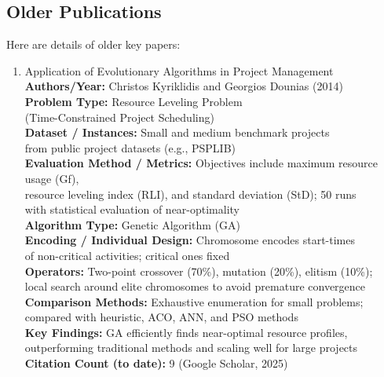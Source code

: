 \documentclass[a4paper,12pt]{article}
\begin{document}
\subsection{Older Publications}
Here are details of older key papers:
\begin{enumerate}[leftmargin=2em, labelwidth=1em, labelsep=0.5em, itemsep=1ex]
  \item Application of Evolutionary Algorithms in Project Management \\
    \textbf{Authors/Year:} Christos Kyriklidis and Georgios Dounias (2014) \\  
    \textbf{Problem Type:} Resource Leveling Problem\\
    (Time-Constrained Project Scheduling) \\  
    \textbf{Dataset / Instances:} Small and medium benchmark projects\\
    from public project datasets (e.g., PSPLIB) \\  
    \textbf{Evaluation Method / Metrics:} Objectives include maximum resource usage (Gf),\\
    resource leveling index (RLI), and standard deviation (StD); 50 runs\\
    with statistical evaluation of near-optimality \\  
    \textbf{Algorithm Type:} Genetic Algorithm (GA) \\  
    \textbf{Encoding / Individual Design:} Chromosome encodes start-times\\
    of non-critical activities; critical ones fixed \\  
    \textbf{Operators:} Two-point crossover (70\%), mutation (20\%), elitism (10\%);\\
    local search around elite chromosomes to avoid premature convergence \\  
    \textbf{Comparison Methods:} Exhaustive enumeration for small problems;\\
    compared with heuristic, ACO, ANN, and PSO methods \\  
    \textbf{Key Findings:} GA efficiently finds near-optimal resource profiles,\\
    outperforming traditional methods and scaling well for large projects \\  
    \textbf{Citation Count (to date):} 9 (Google Scholar, 2025) \\[2ex]
\end{enumerate}
\end{document}
